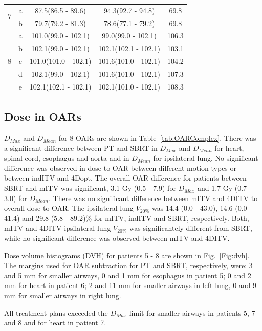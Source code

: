 \begin{table}[H]
\begin{tabular}{c|c|c|c|c}
\multirow{2}{*}{7} & a & 87.5(86.5 - 89.6) & 94.3(92.7 - 94.8) & 69.8\\ 
 & b & 79.7(79.2 - 81.3) & 78.6(77.1 - 79.2) & 69.8\\ 
\hline

\multirow{5}{*}{8} & a & 101.0(99.0 - 102.1) & 99.0(99.0 - 102.1) & 106.3\\ 
 & b & 102.1(99.0 - 102.1) & 102.1(102.1 - 102.1) & 103.1\\ 
 & c & 101.0(101.0 - 102.1) & 101.6(101.0 - 102.1) & 104.2\\ 
 & d & 102.1(99.0 - 102.1) & 101.6(101.0 - 102.1) & 107.3\\ 
 & e & 102.1(102.1 - 102.1) & 102.1(101.0 - 102.1) & 108.3\\ 
\hline\hline
	\end{tabular}
	\label{tab:resultsComplex}
\end{table}

\subsection{Dose in OARs}

$D_{Max}$ and $D_{Mean}$ for 8 OARs are shown in Table~\ref{tab:OARComplex}. There was a significant difference between PT and SBRT in $D_{Max}$ and $D_{Mean}$ for heart, spinal cord, esophagus and aorta and in $D_{Mean}$ for ipsilateral lung.
No significant difference was observed in dose to OAR between different motion types or between indITV and 4Dopt.
The overall OAR difference for patients between SBRT and mITV
was significant, 3.1 Gy (0.5 - 7.9)  for $D_{Max}$ and 1.7 Gy (0.7 - 3.0) for $D_{Mean}$. There was no significant difference between mITV and 4DITV to overall dose to OAR.
The ipsilateral lung $V_{20\%}$ was 14.4 (0.0 - 43.0), 14.6 (0.0 - 41.4) and 29.8 (5.8 - 89.2)\% for mITV, indITV and SBRT, respectively. Both, mITV and 4DITV ipsilateral lung $V_{20\%}$ was
significantely different from SBRT, while no significant difference was observed between mITV and 4DITV.

Dose volume histograms (DVH) for patients 5 - 8 are shown in Fig.~\ref{Fig:dvh}. The margins used for OAR subtraction for PT and SBRT, respectively, were:
3 and 5 mm for smaller airways, 0 and 1 mm for esophagus in patient 5; 
0 and 2 mm for heart in patient 6; 
2 and 11 mm for smaller airways in left lung, 0 and 9 mm for smaller airways in right lung.

All treatment plans exceeded the $D_{Max}$ limit for smaller airways in patients 5, 7 and 8 and for heart in patient 7.


